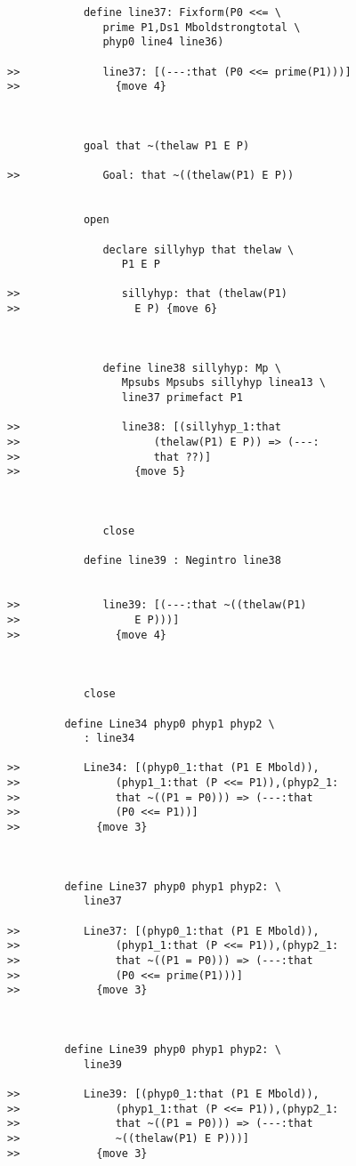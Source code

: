 \documentclass[12pt]{article}
\begin{document}
\begin{verbatim}
            define line37: Fixform(P0 <<= \
               prime P1,Ds1 Mboldstrongtotal \
               phyp0 line4 line36)

>>             line37: [(---:that (P0 <<= prime(P1)))]
>>               {move 4}



            goal that ~(thelaw P1 E P)

>>             Goal: that ~((thelaw(P1) E P))


            open

               declare sillyhyp that thelaw \
                  P1 E P

>>                sillyhyp: that (thelaw(P1)
>>                  E P) {move 6}



               define line38 sillyhyp: Mp \
                  Mpsubs Mpsubs sillyhyp linea13 \
                  line37 primefact P1

>>                line38: [(sillyhyp_1:that
>>                     (thelaw(P1) E P)) => (---:
>>                     that ??)]
>>                  {move 5}



               close

            define line39 : Negintro line38


>>             line39: [(---:that ~((thelaw(P1)
>>                  E P)))]
>>               {move 4}



            close

         define Line34 phyp0 phyp1 phyp2 \
            : line34

>>          Line34: [(phyp0_1:that (P1 E Mbold)),
>>               (phyp1_1:that (P <<= P1)),(phyp2_1:
>>               that ~((P1 = P0))) => (---:that
>>               (P0 <<= P1))]
>>            {move 3}



         define Line37 phyp0 phyp1 phyp2: \
            line37

>>          Line37: [(phyp0_1:that (P1 E Mbold)),
>>               (phyp1_1:that (P <<= P1)),(phyp2_1:
>>               that ~((P1 = P0))) => (---:that
>>               (P0 <<= prime(P1)))]
>>            {move 3}



         define Line39 phyp0 phyp1 phyp2: \
            line39

>>          Line39: [(phyp0_1:that (P1 E Mbold)),
>>               (phyp1_1:that (P <<= P1)),(phyp2_1:
>>               that ~((P1 = P0))) => (---:that
>>               ~((thelaw(P1) E P)))]
>>            {move 3}




\end{verbatim}
\end{document}

